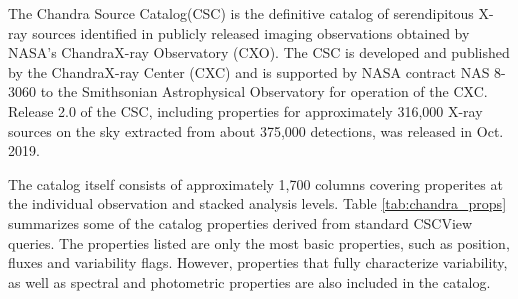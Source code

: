 The Chandra Source Catalog(CSC) is the definitive catalog of serendipitous X-ray sources identified in
publicly released imaging observations obtained by NASA’s ChandraX-ray Observatory (CXO).  The CSC is
developed and published by the ChandraX-ray Center (CXC) and is supported by NASA contract NAS 8-3060
to the Smithsonian Astrophysical Observatory for operation of the CXC.  Release 2.0 of the CSC, including
properties for approximately 316,000 X-ray sources on the sky extracted from about 375,000 detections,
was released in Oct. 2019. %

The catalog itself consists of approximately 1,700 columns covering properites at the individual observation and stacked analysis levels.
Table \ref{tab:chandra_props} summarizes some of the catalog properties derived from standard CSCView queries.  The properties listed are
only the most basic properties, such as position, fluxes and variability flags.  However, properties that fully characterize variability, 
as well as spectral and photometric properties are also included in the catalog.

